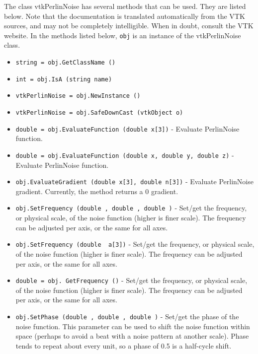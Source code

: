 The class vtkPerlinNoise has several methods that can be used.
  They are listed below.
Note that the documentation is translated automatically from the VTK sources,
and may not be completely intelligible.  When in doubt, consult the VTK website.
In the methods listed below, \verb|obj| is an instance of the vtkPerlinNoise class.
\begin{itemize}
\item  \verb|string = obj.GetClassName ()|

\item  \verb|int = obj.IsA (string name)|

\item  \verb|vtkPerlinNoise = obj.NewInstance ()|

\item  \verb|vtkPerlinNoise = obj.SafeDownCast (vtkObject o)|

\item  \verb|double = obj.EvaluateFunction (double x[3])| -  Evaluate PerlinNoise function.

\item  \verb|double = obj.EvaluateFunction (double x, double y, double z)| -  Evaluate PerlinNoise function.

\item  \verb|obj.EvaluateGradient (double x[3], double n[3])| -  Evaluate PerlinNoise gradient.  Currently, the method returns a 0 
 gradient.

\item  \verb|obj.SetFrequency (double , double , double )| -  Set/get the frequency, or physical scale,  of the noise function 
 (higher is finer scale).  The frequency can be adjusted per axis, or
 the same for all axes.

\item  \verb|obj.SetFrequency (double  a[3])| -  Set/get the frequency, or physical scale,  of the noise function 
 (higher is finer scale).  The frequency can be adjusted per axis, or
 the same for all axes.

\item  \verb|double = obj. GetFrequency ()| -  Set/get the frequency, or physical scale,  of the noise function 
 (higher is finer scale).  The frequency can be adjusted per axis, or
 the same for all axes.

\item  \verb|obj.SetPhase (double , double , double )| -  Set/get the phase of the noise function.  This parameter can be used to
 shift the noise function within space (perhaps to avoid a beat with a
 noise pattern at another scale).  Phase tends to repeat about every
 unit, so a phase of 0.5 is a half-cycle shift.


\end{itemize}
